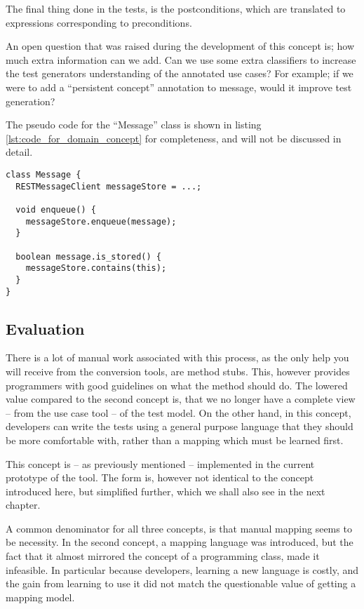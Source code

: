 \noindent The final thing done in the tests, is the postconditions, which are translated to expressions corresponding to preconditions.\medskip

\noindent An open question that was raised during the development of this concept is; how much extra information can we add. Can we use some extra classifiers to increase the test generators understanding of the annotated use cases? For example; if we were to add a ``persistent concept'' annotation to message, would it improve test generation?\medskip

\noindent The pseudo code for the ``Message'' class is shown in listing \ref{lst:code_for_domain_concept} for completeness, and will not be discussed in detail.
\begin{lstlisting}[style=Dart, caption=Pseudo code representing Message domain concept,label={lst:code_for_domain_concept}]
class Message {
  RESTMessageClient messageStore = ...;
  
  void enqueue() {
    messageStore.enqueue(message);
  }

  boolean message.is_stored() {
    messageStore.contains(this);
  }
}
\end{lstlisting}
\subsection{Evaluation}
There is a lot of manual work associated with this process, as the only help you will receive from the conversion tools, are method stubs. This, however provides programmers with good guidelines on what the method should do. The lowered value compared to the second concept is, that we no longer have a complete view -- from the use case tool -- of the test model. On the other hand, in this concept, developers can write the tests using a general purpose language that they should be more comfortable with, rather than a mapping which must be learned first.\medskip

\noindent This concept is -- as previously mentioned -- implemented in the current prototype of the tool. The form is, however not identical to the concept introduced here, but simplified further, which we shall also see in the next chapter.\medskip

\noindent A common denominator for all three concepts, is that manual mapping seems to be necessity. In the second concept, a mapping language was introduced, but the fact that it almost mirrored the concept of a programming class, made it infeasible. In particular because developers, learning a new language is costly, and the gain from learning to use it did not match the questionable value of getting a mapping model.